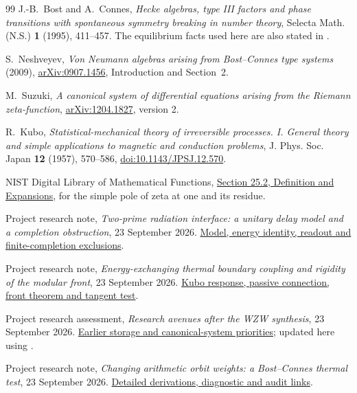 \begin{thebibliography}{99}
J.-B.~Bost and A.~Connes,
\emph{Hecke algebras, type III factors and phase transitions with
spontaneous symmetry breaking in number theory},
Selecta Math. (N.S.) \textbf{1} (1995), 411--457.
The equilibrium facts used here are also stated in \cite{Neshveyev}.

S.~Neshveyev, \emph{Von Neumann algebras arising from Bost--Connes
type systems} (2009),
\href{https://arxiv.org/html/0907.1456}{arXiv:0907.1456},
Introduction and Section~2.

M.~Suzuki, \emph{A canonical system of differential equations arising
from the Riemann zeta-function},
\href{https://arxiv.org/abs/1204.1827}{arXiv:1204.1827}, version 2.

R.~Kubo, \emph{Statistical-mechanical theory of irreversible processes.
I. General theory and simple applications to magnetic and conduction
problems}, J. Phys. Soc. Japan \textbf{12} (1957), 570--586,
\href{https://doi.org/10.1143/JPSJ.12.570}{doi:10.1143/JPSJ.12.570}.

NIST Digital Library of Mathematical Functions,
\href{https://dlmf.nist.gov/25.2}{Section 25.2, Definition and Expansions},
for the simple pole of zeta at one and its residue.

Project research note, \emph{Two-prime radiation interface: a unitary
delay model and a completion obstruction}, 23 September 2026.
\href{notes/FINITE_PLACE_RADIATION_INTERFACE_TEST_20260923.md}{Model, energy identity, readout and finite-completion exclusions}.

Project research note, \emph{Energy-exchanging thermal boundary coupling
and rigidity of the modular front}, 23 September 2026.
\href{notes/THERMAL_BOUNDARY_COUPLING_AND_FRONT_RIGIDITY_TEST_20260923.md}{Kubo response, passive connection, front theorem and tangent test}.

Project research assessment, \emph{Research avenues after the WZW
synthesis}, 23 September 2026.
\href{notes/RESEARCH_AVENUES_20260923.md}{Earlier storage and canonical-system priorities}; updated here using
\cite{InterfaceNote,BoundaryNote}.

Project research note, \emph{Changing arithmetic orbit weights:
a Bost--Connes thermal test}, 23 September 2026.
\href{notes/ARITHMETIC_ORBIT_WEIGHTS_AND_BOST_CONNES_TEST_20260923.md}{Detailed derivations, diagnostic and audit links}.


\end{thebibliography}
